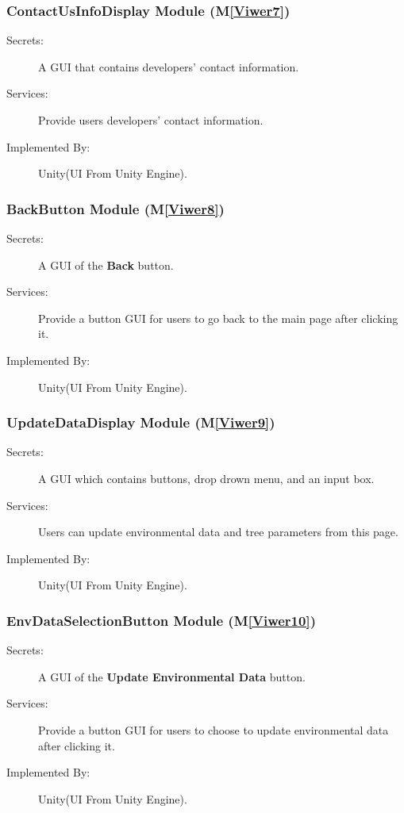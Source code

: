 \documentclass[12pt, titlepage]{article}
\newcommand{\mref}[1]{M\ref{#1}}
\begin{document}
\subsubsection{ContactUsInfoDisplay Module (\mref{Viwer7})}
\begin{description}
\item[Secrets:] A GUI that contains developers' contact information. 
\item[Services:] Provide users developers' contact information.
\item[Implemented By:] Unity(UI From Unity Engine).
\end{description}

\renewcommand\bt{\textbf{Back } }
\subsubsection{BackButton Module (\mref{Viwer8})}
\begin{description}
\item[Secrets:] A GUI of the \bt button.
\item[Services:] Provide a button GUI for users to go back to the main page after 
clicking it.
\item[Implemented By:]Unity(UI From Unity Engine).
\end{description}

\subsubsection{UpdateDataDisplay Module (\mref{Viwer9})}
\begin{description}
\item[Secrets:] A GUI which contains buttons, drop drown menu, and an input box.
\item[Services:] Users can update environmental data and tree parameters from this page.
\item[Implemented By:] Unity(UI From Unity Engine).
\end{description}

\renewcommand\bt{\textbf{Update Environmental Data }}
\subsubsection{EnvDataSelectionButton Module (\mref{Viwer10})}
\begin{description}
\item[Secrets:] A GUI of the \bt button.
\item[Services:] Provide a button GUI for users to choose to update 
environmental data after clicking it.
\item[Implemented By:]Unity(UI From Unity Engine).
\end{description}
\end{document}
